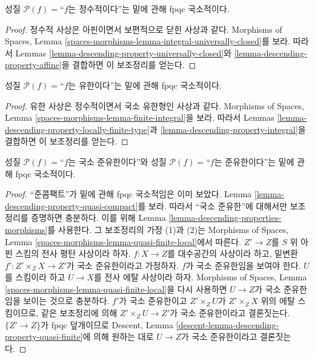 \begin{lemma}
\label{lemma-descending-property-integral}
성질 $\mathcal{P}(f)=$``$f$는 정수적이다''는 밑에 관해 fpqc 국소적이다.
\end{lemma}

\begin{proof}
정수적 사상은 아핀이면서 보편적으로 닫힌 사상과 같다. Morphisms of
Spaces, Lemma \ref{spaces-morphisms-lemma-integral-universally-closed}를
보라. 따라서 Lemmas \ref{lemma-descending-property-universally-closed}와
\ref{lemma-descending-property-affine}을 결합하면 이 보조정리를 얻는다.
\end{proof}

\begin{lemma}
\label{lemma-descending-property-finite}
성질 $\mathcal{P}(f)=$``$f$는 유한이다''는 밑에 관해 fpqc 국소적이다.
\end{lemma}

\begin{proof}
유한 사상은 정수적이면서 국소 유한형인 사상과 같다.
Morphisms of Spaces, Lemma \ref{spaces-morphisms-lemma-finite-integral}을
보라. 따라서 Lemmas \ref{lemma-descending-property-locally-finite-type}과
\ref{lemma-descending-property-integral}을 결합하면 이 보조정리를 얻는다.
\end{proof}

\begin{lemma}
\label{lemma-descending-property-quasi-finite}
성질
$\mathcal{P}(f)=$``$f$는 국소 준유한이다''와
성질
$\mathcal{P}(f)=$``$f$는 준유한이다''는
밑에 관해 fpqc 국소적이다.
\end{lemma}

\begin{proof}
``준콤팩트''가 밑에 관해 fpqc 국소적임은 이미 보았다. Lemma
\ref{lemma-descending-property-quasi-compact}를 보라. 따라서
``국소 준유한''에 대해서만 보조정리를 증명하면 충분하다. 이를 위해
Lemma \ref{lemma-descending-properties-morphisms}를 사용한다. 그 보조정리의
가정 (1)과 (2)는 Morphisms of Spaces, Lemma
\ref{spaces-morphisms-lemma-quasi-finite-local}에서 따른다. $Z'\to Z$를
$S$ 위 아핀 스킴의 전사 평탄 사상이라 하자. $f:X\to Z$를 대수공간의
사상이라 하고, 밑변환 $f':Z'\times_ZX\to Z'$가 국소 준유한이라고
가정하자. $f$가 국소 준유한임을 보여야 한다. $U$를 스킴이라 하고
$U\to X$를 전사 에탈 사상이라 하자. Morphisms of Spaces, Lemma
\ref{spaces-morphisms-lemma-quasi-finite-local}을 다시 사용하면
$U\to Z$가 국소 준유한임을 보이는 것으로 충분하다. $f'$가 국소
준유한이고 $Z'\times_ZU$가 $Z'\times_ZX$ 위의 에탈 스킴이므로,
같은 보조정리에 의해 $Z'\times_ZU\to Z'$가 국소 준유한이라고
결론짓는다. $\{Z'\to Z\}$가 fpqc 덮개이므로 Descent, Lemma
\ref{descent-lemma-descending-property-quasi-finite}에 의해 원하는 대로
$U\to Z$가 국소 준유한이라고 결론짓는다.
\end{proof}

